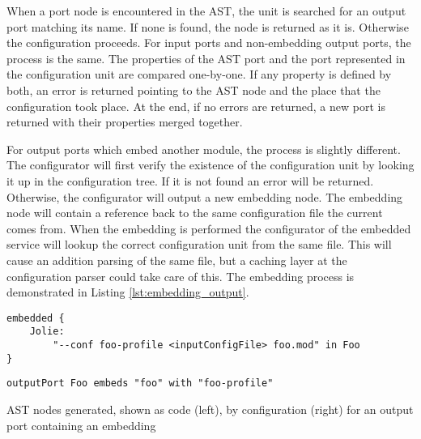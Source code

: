 When a port node is encountered in the AST, the  unit is searched
for an output port matching its name. If none is found, the node is returned as
it is. Otherwise the configuration proceeds. For input ports and non-embedding
output ports, the process is the same. The properties of the AST port and the
port represented in the configuration unit are compared one-by-one. If any
property is defined by both, an error is returned pointing to the AST node and
the place that the configuration took place. At the end, if no errors are
returned, a new port is returned with their properties merged together.

For output ports which embed another module, the process is slightly different.
The configurator will first verify the existence of the configuration unit by
looking it up in the configuration tree. If it is not found an error will be
returned. Otherwise, the configurator will output a new embedding node. The
embedding node will contain a reference back to the same configuration file the
current  comes from. When the embedding is performed the
configurator of the embedded service will lookup the correct configuration unit
from the same file. This will cause an addition parsing of the same file, but a
caching layer at the configuration parser could take care of this.  The
embedding process is demonstrated in Listing \ref{lst:embedding_output}.

\begin{listing}[H]
\begin{multicols}{2}

\begin{verbatim}
embedded {
    Jolie:
        "--conf foo-profile <inputConfigFile> foo.mod" in Foo
}
\end{verbatim}

\columnbreak

\begin{verbatim}
outputPort Foo embeds "foo" with "foo-profile"
\end{verbatim}

\end{multicols}

\caption{AST nodes generated, shown as code (left), by configuration (right)
    for an output port containing an embedding}

\label{lst:embedding_output}

\end{listing}

